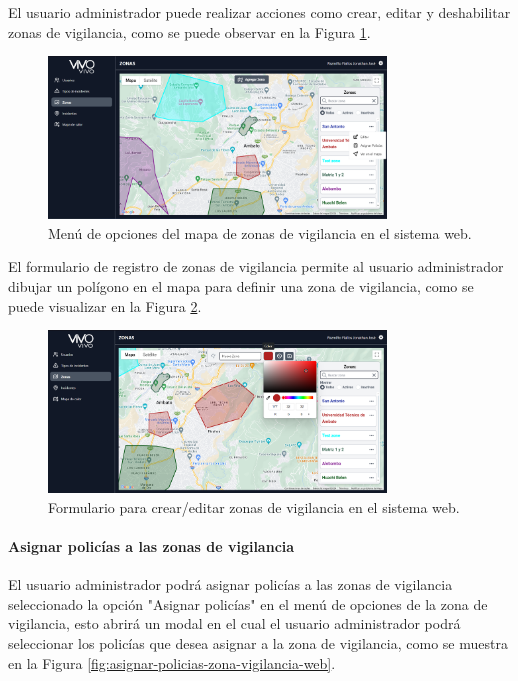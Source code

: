 El usuario administrador puede realizar acciones como crear, editar y deshabilitar zonas de vigilancia, como se puede observar en la Figura
\ref{fig:menu-mapa-zonas-vigilancia-web}.

\begin{figure}[H]
    \centering
    \includegraphics[width=0.8\textwidth]{chapters/III-resultados-y-discusion/resources/images/menu-mapa-zonas-vigilancia-web.png}
    \caption{Menú de opciones del mapa de zonas de vigilancia en el sistema web.}
    \label{fig:menu-mapa-zonas-vigilancia-web}
\end{figure}

El formulario de registro de zonas de vigilancia permite al usuario administrador dibujar un polígono en el mapa para definir una
zona de vigilancia, como se puede visualizar en la Figura \ref{fig:formulario-zona-vigilancia-web}.

\begin{figure}[H]
    \centering
    \includegraphics[width=0.8\textwidth]{chapters/III-resultados-y-discusion/resources/images/formulario-zona-vigilancia-web.png}
    \caption{Formulario para crear/editar zonas de vigilancia en el sistema web.}
    \label{fig:formulario-zona-vigilancia-web}
\end{figure}

\paragraph{Asignar policías a las zonas de vigilancia}
El usuario administrador podrá asignar policías a las zonas de vigilancia seleccionado la opción "Asignar policías" en el menú de opciones
de la zona de vigilancia, esto abrirá un modal en el cual el usuario administrador podrá seleccionar los policías que desea asignar a la
zona de vigilancia, como se muestra en la Figura \ref{fig:asignar-policias-zona-vigilancia-web}.

